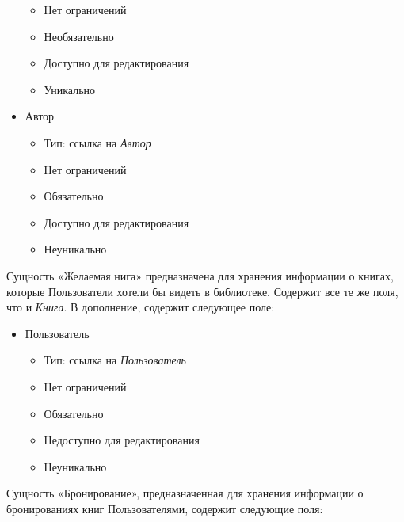 \documentclass[data-specification.tex]{subfiles}
\begin{document}
\begin{itemize}
\begin{itemize}
        \item Нет ограничений
        \item Необязательно
        \item Доступно для редактирования
        \item Уникально
    \end{itemize}
    \item Автор
    \begin{itemize}
        \item Тип: ссылка на \textsl{Автор}
        \item Нет ограничений
        \item Обязательно
        \item Доступно для редактирования
        \item Неуникально
    \end{itemize}
\end{itemize}
\par
Сущность «Желаемая нига» предназначена для хранения информации о книгах, которые Пользователи хотели бы видеть в библиотеке. Содержит все те же поля, что и \textsl{Книга}. В дополнение, содержит следующее поле:
\begin{itemize}
    \item Пользователь
    \begin{itemize}
        \item Тип: ссылка на \textsl{Пользователь}
        \item Нет ограничений
        \item Обязательно
        \item Недоступно для редактирования
        \item Неуникально
    \end{itemize}
\end{itemize}
\par
Сущность «Бронирование», предназначенная для хранения информации о бронированиях книг Пользователями, содержит следующие поля:
\end{document}

